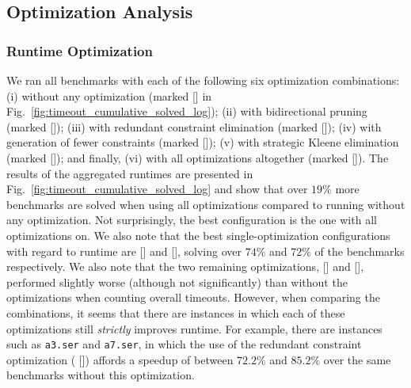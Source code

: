 \begin{table}[htbp]
	\centering
	
	\caption{Overview of the benchmark containing networking and system protocols. 
}
\label{tab:networking-benchmarks}
\end{table}


\subsection{Optimization Analysis}
\label{subsec:optimization-results}

%


\subsubsection{Runtime Optimization}

We ran all benchmarks with each of the following six optimization combinations: 
(i) without any optimization (marked [\texttt{\textbf{\text{-}\text{-}\text{-}\text{-}}}] in Fig.~\ref{fig:timeout_cumulative_solved_log}); (ii) with bidirectional pruning (marked [\texttt{\textbf{\text{-}\text{-}\text{-}}}]); (iii) with redundant constraint elimination (marked [\texttt{\textbf{\text{-}\text{-}\text{-}}}]); (iv) with generation of fewer constraints (marked [\texttt{\textbf{\text{-}\text{-}\text{-}}}]);
(v) with strategic Kleene elimination (marked [\texttt{\textbf{\text{-}\text{-}\text{-}}}]);
and finally, (vi) with all optimizations altogether (marked [\texttt{\textbf{}}]).
%
The results of the aggregated runtimes are presented in Fig.~\ref{fig:timeout_cumulative_solved_log} and show that over $19\%$ more benchmarks are solved when using all optimizations compared to running without any optimization.
%
Not surprisingly, the best configuration is the one with all optimizations on. 
%
We also note that the best single-optimization configurations with regard to runtime are [\texttt{\textbf{\text{-}\text{-}\text{-}}}] and [\texttt{\textbf{\text{-}\text{-}\text{-}}}], solving over $74\%$ and $72\%$ of the benchmarks respectively. 
%
We also note that the two remaining optimizations, [\texttt{\textbf{\text{-}\text{-}\text{-}}}] and [\texttt{\textbf{\text{-}\text{-}\text{-}}}], performed slightly worse (although not significantly) than without the optimizations when counting overall timeouts.
%
However, when comparing the combinations, it seems that there are instances in which each of these optimizations still \textit{strictly} improves runtime.
%
For example, there are instances such as \texttt{a3.ser} and \texttt{a7.ser}, in which the use of the redundant constraint optimization (  [\texttt{\textbf{\text{-}\text{-}\text{-}}}])
affords a speedup of between $72.2\%$ and $85.2\%$ over the same benchmarks without this optimization.

